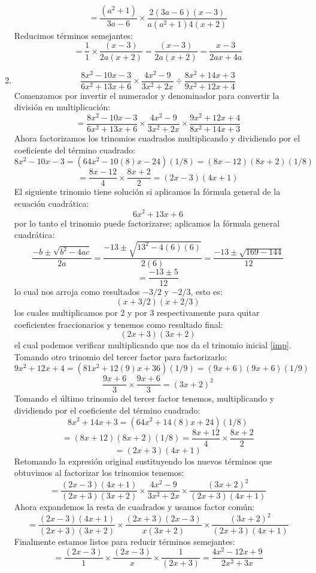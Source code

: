 \documentclass[12pt]{article}
\begin{document}
\begin{enumerate}[label=\bfseries Ejercicio \arabic*:]
$$= \frac{(a^2 + 1)}{3a -6} \times \frac{2(3a - 6)(x - 3)}{a(a^2 +1)4(x + 2)}$$
Reducimos términos semejantes:
$$= \frac{1}{1} \times \frac{(x - 3)}{2a(x + 2)} = \frac{(x - 3)}{2a(x + 2)}  = \frac{x - 3}{2ax + 4a}$$
  \item $$\frac{8x^2 - 10x -3}{6x^2 +13x + 6} \times \frac{4x^2 - 9}{3x^2 + 2x} \div \frac{8x^2 + 14x + 3}{9x^2 + 12x + 4}$$
Comenzamos por invertir el numerador y denominador para convertir la división en multiplicación:
$$= \frac{8x^2 - 10x -3}{6x^2 +13x + 6} \times \frac{4x^2 - 9}{3x^2 + 2x} \times \frac{9x^2 + 12x + 4}{8x^2 + 14x + 3}$$
Ahora factorizamos los trinomios cuadrados multiplicando y dividiendo por el coeficiente del término cuadrado:
$$8x^2 - 10x -3 = (64x^2 - 10(8)x - 24)(1/8) = (8x - 12)(8x + 2)(1/8)$$
$$ = \frac{8x - 12}{4} \times \frac{8x + 2}{2} = (2x - 3)(4x + 1)$$
El siguiente trinomio tiene solución si aplicamos la fórmula general de la ecuación cuadrática: 
\begin{equation}\label{imp}
  6x^2 +13x + 6
\end{equation}
por lo tanto el trinomio puede factorizarse; aplicamos la fórmula general cuadrática:
$$\frac{-b \pm \sqrt{b^2 - 4ac}}{2a} = \frac{-13 \pm \sqrt{13^2 - 4(6)(6)}}{2(6)} = \frac{-13 \pm \sqrt{169 - 144}}{12}$$
$$= \frac{-13 \pm 5}{12}$$
lo cual nos arroja como resultados $-3/2$ y $-2/3$, esto es:
$$(x + 3/2)(x + 2/3)$$
los cuales multiplicamos por 2 y por 3 respectivamente para quitar coeficientes fraccionarios y tenemos como resultado final:
$$(2x + 3)(3x + 2)$$
el cual podemos verificar multiplicando que nos da el trinomio inicial \ref{imp}.
Tomando otro trinomio del tercer factor para factorizarlo:
$$9x^2 + 12x + 4 = (81x^2 + 12(9)x + 36)(1/9) = (9x + 6)(9x + 6)(1/9)$$
$$\frac{9x + 6}{3} \times \frac{9x + 6}{3} = (3x + 2)^2$$
Tomando el último trinomio del tercer factor tenemos, multiplicando y dividiendo por el coeficiente del término cuadrado:
$$8x^2 + 14x + 3 = (64x^2 + 14(8)x + 24)(1/8)$$
$$= (8x + 12)(8x + 2)(1/8) = \frac{8x + 12}{4} \times \frac{8x + 2}{2}$$
$$= (2x + 3)(4x + 1)$$
Retomando la expresión original sustituyendo los nuevos términos que obtuvimos al factorizar los trinomios tenemos:
$$ = \frac{(2x - 3)(4x + 1)}{(2x + 3)(3x + 2)} \times \frac{4x^2 - 9}{3x^2 + 2x} \times \frac{(3x + 2)^2}{(2x + 3)(4x + 1)}$$
Ahora expandemos la resta de cuadrados y usamos factor común:
$$ = \frac{(2x - 3)(4x + 1)}{(2x + 3)(3x + 2)} \times \frac{(2x + 3)(2x -3)}{x(3x + 2)} \times \frac{(3x + 2)^2}{(2x + 3)(4x + 1)}$$
Finalmente estamos listos para reducir términos semejantes:
$$ = \frac{(2x - 3)}{1} \times \frac{(2x -3)}{x} \times \frac{1}{(2x + 3)} = \frac{4x^2 - 12x + 9}{2x^2 + 3x}$$

\end{enumerate}
\end{document}
